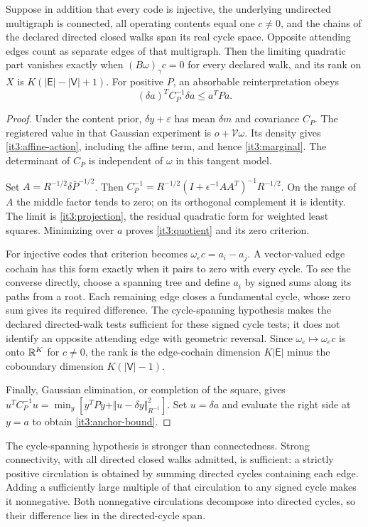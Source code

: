 \documentclass[11pt,letterpaper]{report}
\begin{document}
Suppose in addition that every code is injective, the underlying undirected multigraph is connected, all operating contents equal one $c\ne0$, and the chains of the declared directed closed walks span its real cycle space. Opposite attending edges count as separate edges of that multigraph. Then the limiting quadratic part vanishes exactly when
$(B\omega)_\gamma c=0$ for every declared walk, and its rank on $X$ is
$K(|\mathsf E|-|\mathsf V|+1)$. For positive $P$, an absorbable reinterpretation obeys
\begin{equation}
(\delta a)^TC_P^{-1}\delta a\leq a^TPa.
\label{it3:anchor-bound}
\end{equation}
\begin{proof}
Under the content prior, $\delta y+\varepsilon$ has mean $\delta m$ and covariance $C_P$. The registered value in that Gaussian experiment is $o+\mathcal V\omega$. Its density gives \cref{it3:affine-action}, including the affine term, and hence \cref{it3:marginal}. The determinant of $C_P$ is independent of $\omega$ in this tangent model.

Set $A=R^{-1/2}\delta\bar P^{-1/2}$. Then
$C_P^{-1}=R^{-1/2}(I+\epsilon^{-1}AA^T)^{-1}R^{-1/2}$.
On the range of $A$ the middle factor tends to zero; on its orthogonal complement it is identity. The limit is \cref{it3:projection}, the residual quadratic form for weighted least squares. Minimizing over $a$ proves \cref{it3:quotient} and its zero criterion.

For injective codes that criterion becomes $\omega_ec=a_i-a_j$. A vector-valued edge cochain has this form exactly when it pairs to zero with every cycle. To see the converse directly, choose a spanning tree and define $a_i$ by signed sums along its paths from a root. Each remaining edge closes a fundamental cycle, whose zero sum gives its required difference. The cycle-spanning hypothesis makes the declared directed-walk tests sufficient for these signed cycle tests; it does not identify an opposite attending edge with geometric reversal. Since $\omega_e\mapsto\omega_ec$ is onto $\mathbb R^K$ for $c\ne0$, the rank is the edge-cochain dimension $K|\mathsf E|$ minus the coboundary dimension $K(|\mathsf V|-1)$.

Finally, Gaussian elimination, or completion of the square, gives
$u^TC_P^{-1}u=\min_y[y^TPy+\Vert u-\delta y\Vert_{R^{-1}}^2]$.
Set $u=\delta a$ and evaluate the right side at $y=a$ to obtain \cref{it3:anchor-bound}.
\end{proof}

The cycle-spanning hypothesis is stronger than connectedness. Strong connectivity, with all directed closed walks admitted, is sufficient: a strictly positive circulation is obtained by summing directed cycles containing each edge. Adding a sufficiently large multiple of that circulation to any signed cycle makes it nonnegative. Both nonnegative circulations decompose into directed cycles, so their difference lies in the directed-cycle span.
\end{document}

